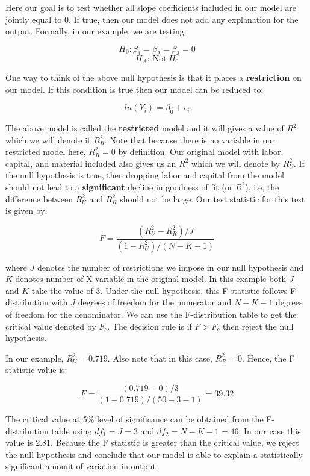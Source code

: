 \documentclass[
]{book}
\theoremstyle{definition}
\theoremstyle{definition}
\theoremstyle{definition}
\theoremstyle{definition}
\theoremstyle{remark}
\begin{document}
Here our goal is to test whether all slope coefficients included in our model are jointly equal to 0. If true, then our model does not add any explanation for the output. Formally, in our example, we are testing:

\[H_0: \beta_1=\beta_2=\beta_3=0\]
\[H_A: \ \text{Not} \ H_0\]

One way to think of the above null hypothesis is that it places a \textbf{restriction} on our model. If this condition is true then our model can be reduced to:

\[ln(Y_i) =\beta_0 + \epsilon_i\]

The above model is called the \textbf{restricted} model and it will gives a value of \(R^2\) which we will denote it \(R^2_R\). Note that because there is no variable in our restricted model here, \(R^2_R=0\) by definition. Our original model with labor, capital, and material included also gives us an \(R^2\) which we will denote by \(R^2_U\). If the null hypothesis is true, then dropping labor and capital from the model should not lead to a \textbf{significant} decline in goodness of fit (or \(R^2\)), i.e, the difference between \(R^2_U\) and \(R^2_R\) should not be large. Our test statistic for this test is given by:

\[F =\frac{(R^2_U - R^2_R)/J}{(1-R^2_U)/(N-K-1)} \]

where \(J\) denotes the number of restrictions we impose in our null hypothesis and \(K\) denotes number of X-variable in the original model. In this example both \(J\) and \(K\) take the value of 3. Under the null hypothesis, this F statistic follows F-distribution with \(J\) degrees of freedom for the numerator and \(N-K-1\) degrees of freedom for the denominator. We can use the F-distribution table to get the critical value denoted by \(F_c\). The decision rule is if \(F>F_c\) then reject the null hypothesis.

In our example, \(R^2_U=0.719\). Also note that in this case, \(R^2_R=0\). Hence, the F statistic value is:

\[F=\frac{(0.719-0)/3}{(1-0.719)/(50-3-1)}=39.32\]

The critical value at 5\% level of significance can be obtained from the F-distribution table using \(df_1=J=3\) and \(df_2=N-K-1=46\). In our case this value is 2.81. Because the F statistic is greater than the critical value, we reject the null hypothesis and conclude that our model is able to explain a statistically significant amount of variation in output.
\end{document}
